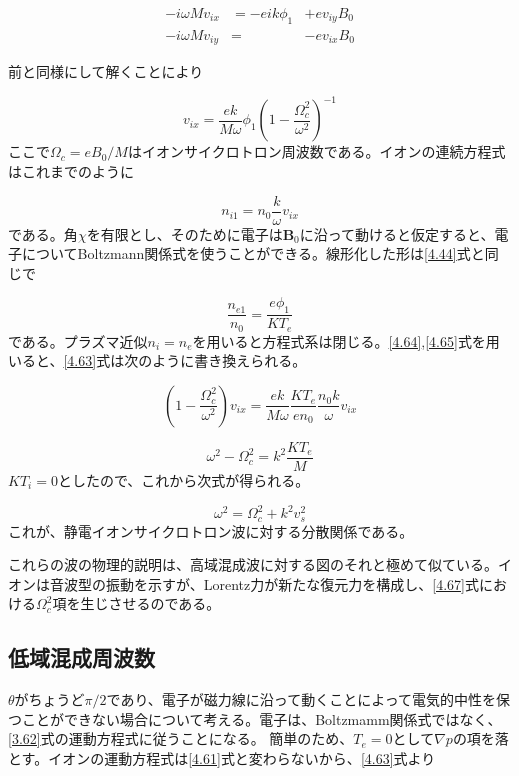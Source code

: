 \documentclass{ltjsarticle}
\numberwithin{equation}{section} %
\begin{document}
\begin{equation}
  \begin{aligned}
    -i\omega Mv_{ix} &= -eik\phi_1 &+ ev_{iy}B_0\\
    -i\omega Mv_{iy} &=            &- ev_{ix}B_0 
  \end{aligned} \label{4.62}
\end{equation}

前と同様にして解くことにより

\begin{equation}
  v_{ix} = \frac{ek}{M\omega}\phi_1\left(1 - \frac{\Omega^2_c}{\omega^2}\right)^{-1} \label{4.63}
\end{equation}
ここで$\Omega_c=eB_0/M$はイオンサイクロトロン周波数である。イオンの連続方程式はこれまでのように

\begin{equation}
  n_{i1} = n_0\frac{k}{\omega}v_{ix} \label{4.64}
\end{equation}
である。角$\chi$を有限とし、そのために電子は$\bm{B}_0$に沿って動けると仮定すると、電子についてBoltzmann関係式を使うことができる。線形化した形は\eqref{4.44}式と同じで

\begin{equation}
  \frac{n_{e1}}{n_0} = \frac{e\phi_1}{KT_e} \label{4.65}
\end{equation}
である。プラズマ近似$n_i = n_e$を用いると方程式系は閉じる。\eqref{4.64},\eqref{4.65}式を用いると、\eqref{4.63}式は次のように書き換えられる。

\[
  \left(1 - \frac{\Omega^2_c}{\omega^2}\right)v_{ix} = \frac{ek}{M\omega}\frac{KT_e}{en_0}\frac{n_0k}{\omega}v_{ix}
\]

\begin{equation}
  \omega^2 - \Omega^2_c = k^2\frac{KT_e}{M} \label{4.66}
\end{equation}
$KT_i=0$としたので、これから次式が得られる。

\begin{equation}
  \boxed{\omega^2 = \Omega^2_c + k^2v_s^2} \label{4.67}
\end{equation}
これが、静電イオンサイクロトロン波に対する分散関係である。

これらの波の物理的説明は、高域混成波に対する図のそれと極めて似ている。イオンは音波型の振動を示すが、Lorentz力が新たな復元力を構成し、\eqref{4.67}式における$\Omega^2_c$項を生じさせるのである。


\subsection{低域混成周波数} \label{section4.11}
$\theta$がちょうど$\pi/2$であり、電子が磁力線に沿って動くことによって電気的中性を保つことができない場合について考える。電子は、Boltzmamm関係式ではなく、\eqref{3.62}式の運動方程式に従うことになる。
簡単のため、$T_e=0$として$\nabla p$の項を落とす。イオンの運動方程式は\eqref{4.61}式と変わらないから、\eqref{4.63}式より
\end{document}
